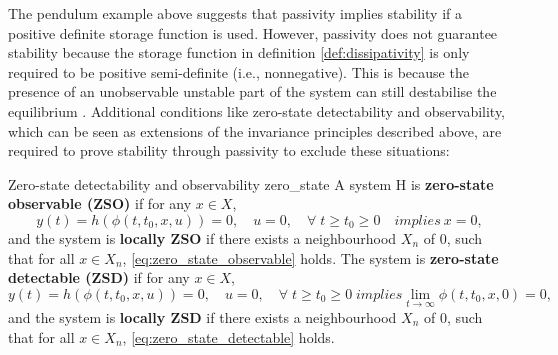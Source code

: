 The pendulum example above suggests that passivity implies stability if a positive definite storage function is used. However, passivity does not guarantee stability because the storage function in definition \ref{def:dissipativity} is only required to be positive semi-definite (i.e., nonnegative). This is because the presence of an unobservable unstable part of the system can still destabilise the equilibrium \cite{baoProcessControlPassive2007}. Additional conditions like zero-state detectability and observability, which can be seen as extensions of the invariance principles described above, are required to prove stability through passivity to exclude these situations:

\begin{definition}[list text=Zero-state detectability and observability]{Zero-state detectability and observability \cite{baoProcessControlPassive2007}}{zero_state}
  A system H is \textbf{zero-state observable (ZSO)} if for any $x \in X$,
  \begin{equation} \label{eq:zero_state_observable}
    y\left(t\right) = h\left(\phi\left(t, t_0, x, u \right)\right) = 0, \quad u = 0, \quad \forall \; t \geq t_0 \geq 0 \quad implies \ x = 0,
  \end{equation}
  and the system is \textbf{locally ZSO} if there exists a neighbourhood $X_n$ of $0$, such that for all $x \in X_n$, \eqref{eq:zero_state_observable} holds. The system is \textbf{zero-state detectable (ZSD)} if for any $x \in X$,
  \begin{equation} \label{eq:zero_state_detectable}
    y\left(t\right) = h\left(\phi\left(t, t_0, x, u\right)\right) = 0, \quad u = 0, \quad \forall \; t \geq t_0 \geq 0 \; implies \lim_{t \rightarrow\infty}{\phi \left(t, t_0, x, 0\right) = 0},
  \end{equation}
  and the system is \textbf{locally ZSD} if there exists a neighbourhood $X_n$ of $0$, such that for all $x \in X_n$, \eqref{eq:zero_state_detectable} holds.
\end{definition}

